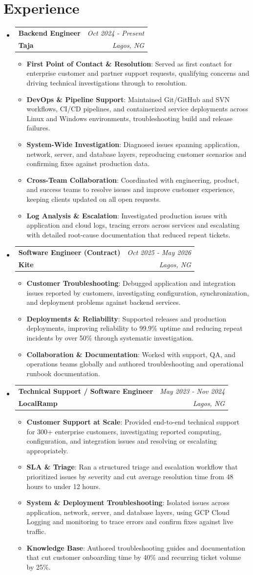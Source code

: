 \documentclass[a4paper, 20pt]{article}
\makeatletter
\newcommand{\resumeItem}[2]{ \item\small{ \textbf{#1}{: #2} } }
\newcommand{\resumeJobHeading}[4]{ %
\vspace{4pt}
\item[]
\begin{tabular*}{0.97\textwidth}{l@{\extracolsep{\fill}}r}
	\textbf{#1} & \textit{#3} \\
	\textbf{#4} & \textit{#2} \\
\end{tabular*}
\vspace{0pt}
}
\newcommand{\resumeSubHeadingListStart}{\begin{itemize}[leftmargin=*,topsep=2pt]}
\newcommand{\resumeSubHeadingListEnd}{\end{itemize}}
\newcommand{\resumeItemListStart}{\begin{itemize}[topsep=0pt,itemsep=0pt,parsep=0pt]}
\newcommand{\resumeItemListEnd}{\end{itemize}}
\makeatother
\begin{document}
	\vspace{-5pt}
	\section{Experience}
	\resumeSubHeadingListStart
	\resumeJobHeading{Backend Engineer}{Lagos, NG}{Oct 2024 - Present}{Taja}
	\resumeItemListStart
	\resumeItem{First Point of Contact \& Resolution}
	{Served as first contact for enterprise customer and partner support requests, qualifying concerns and driving technical investigations through to resolution.}
	\resumeItem{DevOps \& Pipeline Support}
	{Maintained Git/GitHub and SVN workflows, CI/CD pipelines, and containerized service deployments across Linux and Windows environments, troubleshooting build and release failures.}
	\resumeItem{System-Wide Investigation}
	{Diagnosed issues spanning application, network, server, and database layers, reproducing customer scenarios and confirming fixes against production data.}
	\resumeItem{Cross-Team Collaboration}
	{Coordinated with engineering, product, and success teams to resolve issues and improve customer experience, keeping clients updated on all open requests.}
	\resumeItem{Log Analysis \& Escalation}
	{Investigated production issues with application and cloud logs, tracing errors across services and escalating with detailed root-cause documentation that reduced repeat tickets.}
	\resumeItemListEnd

	\resumeJobHeading{Software Engineer (Contract)}{Lagos, NG}{Oct 2025 - May 2026}{Kite}
	\resumeItemListStart
	\resumeItem{Customer Troubleshooting}
	{Debugged application and integration issues reported by customers, investigating configuration, synchronization, and deployment problems against backend services.}
	\resumeItem{Deployments \& Reliability}
	{Supported releases and production deployments, improving reliability to 99.9\% uptime and reducing repeat incidents by over 50\% through systematic investigation.}
	\resumeItem{Collaboration \& Documentation}
{Worked with support, QA, and operations teams globally and authored troubleshooting and operational runbook documentation.}
	\resumeItemListEnd

	\resumeJobHeading{Technical Support / Software Engineer}{Lagos, NG}{May 2023 - Nov 2024}{LocalRamp}
	\resumeItemListStart
	\resumeItem{Customer Support at Scale}
	{Provided end-to-end technical support for 300+ enterprise customers, investigating reported computing, configuration, and integration issues and resolving or escalating appropriately.}
	\resumeItem{SLA \& Triage}
	{Ran a structured triage and escalation workflow that prioritized issues by severity and cut average resolution time from 48 hours to under 12 hours.}
	\resumeItem{System \& Deployment Troubleshooting}
	{Isolated issues across application, network, server, and database layers, using GCP Cloud Logging and monitoring to trace errors and confirm fixes against live traffic.}
	\resumeItem{Knowledge Base}
	{Authored troubleshooting guides and documentation that cut customer onboarding time by 40\% and recurring ticket volume by 25\%.}
	\resumeItemListEnd
	\resumeSubHeadingListEnd
\end{document}

